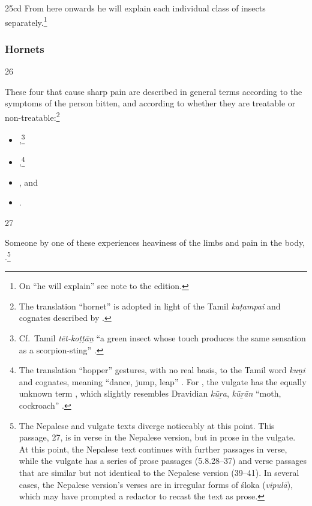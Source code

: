 \begin{translation}
\item[25cd] 
\label{ekajati}
From here onwards he will explain each individual class of insects
separately.\footnote{On  “he will explain” see note to
    the edition.}

\subsubsection{Hornets}
\item[26]

These four  that cause sharp pain are described
in general terms according to the symptoms of the person bitten, and
according to whether they are treatable or non-treatable:\footnote{The
    translation “hornet” is adopted in light of the Tamil \emph{kaṭampai}
    and cognates described by \cite[\#1117]{DED}.}
\begin{itemize}
    \item {},\footnote{Cf.\ Tamil 
    \emph{t\={e}t-koṭṭā\b{n}} “a green insect whose touch produces the same 
    sensation as a scorpion-sting” \citep[\#2064]{DED}.} 
    \item {},\footnote{The translation “hopper” gestures,
    with no real basis, to the Tamil word \emph{kuṉi} and cognates,
    meaning “dance, jump, leap” \citep[\#1863]{DED}. For ,
    the vulgate has the equally unknown term , which slightly 
    resembles Dravidian \emph{kū\b{r}a}, \emph{kū\b{r}ān} “moth, cockroach” 
    \citep[\#1926]{DED}.}
     \item    {}, and \item {}.
\end{itemize}

\item[27]

Someone  by one of these experiences heaviness of the limbs 
and pain in the 
body, .\footnote{The 
Nepalese and vulgate texts diverge noticeably at this point.  This passage, 27, is in 
verse in the Nepalese version, but in prose in the vulgate.  At this 
point, the Nepalese text continues with further passages in verse, while 
the vulgate has a series of prose passages (5.8.28--37) and verse passages that are 
similar but not identical to the Nepalese version (39--41).  In several cases, 
the Nepalese version's verses are in irregular forms of śloka (\emph{vipulā}), 
which may have prompted a redactor to recast the text as prose.}


\end{translation}

